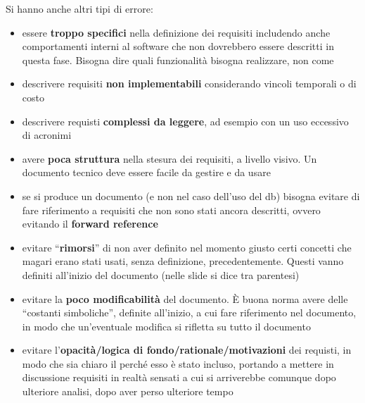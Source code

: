 \documentclass[a4paper,12pt, oneside]{book}
\begin{document}
Si hanno anche altri tipi di errore:
\begin{itemize}
  \item essere \textbf{troppo specifici} nella definizione dei requisiti
  includendo anche comportamenti interni al software che non dovrebbero essere
  descritti in questa fase. Bisogna dire quali funzionalità bisogna realizzare,
  non come
  \item descrivere requisiti \textbf{non implementabili} considerando vincoli
  temporali o di costo
  \item descrivere requisti \textbf{complessi da leggere}, ad esempio con un uso
  eccessivo di acronimi
  \item avere \textbf{poca struttura} nella stesura dei requisiti, a livello
  visivo. Un documento tecnico deve essere facile da gestire e da usare
  \item se si produce un documento (e non nel caso dell'uso del db) bisogna
  evitare di fare riferimento a requisiti che non sono stati ancora descritti,
  ovvero evitando il \textbf{forward reference}
  \item evitare ``\textbf{rimorsi}'' di non aver definito nel momento giusto
  certi concetti che magari erano stati usati, senza definizione,
  precedentemente. Questi vanno definiti all'inizio del documento (nelle slide
  si dice tra parentesi)
  \item evitare la \textbf{poco modificabilità} del documento. È buona norma
  avere delle ``costanti simboliche'', definite all'inizio, a cui fare
  riferimento nel documento, in modo che un'eventuale modifica si rifletta su
  tutto il documento
  \item evitare l'\textbf{opacità/logica di fondo/rationale/motivazioni} dei
  requisti, in modo che sia 
  chiaro il perché esso è stato incluso, portando a mettere in discussione
  requisiti in realtà sensati a cui si arriverebbe comunque dopo ulteriore
  analisi, dopo aver perso ulteriore tempo
  
\end{itemize}
\end{document}
